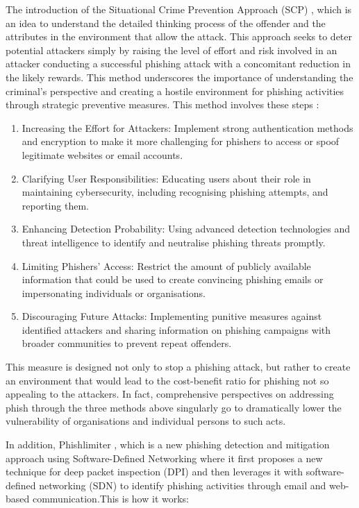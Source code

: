 The introduction of the Situational Crime Prevention Approach (SCP) \cite{Suzuki2021Phishing}, which is an idea to understand the detailed thinking process of the offender and the attributes in the environment that allow the attack. This approach seeks to deter potential attackers simply by raising the level of effort and risk involved in an attacker conducting a successful phishing attack with a concomitant reduction in the likely rewards. This method underscores the importance of understanding the criminal's perspective and creating a hostile environment for phishing activities through strategic preventive measures. This method involves these steps : 

\begin{enumerate}
    \item Increasing the Effort for Attackers: Implement strong authentication methods and encryption to make it more challenging for phishers to access or spoof legitimate websites or email accounts.
    \item Clarifying User Responsibilities: Educating users about their role in maintaining cybersecurity, including recognising phishing attempts, and reporting them.
    \item Enhancing Detection Probability: Using advanced detection technologies and threat intelligence to identify and neutralise phishing threats promptly.
    \item Limiting Phishers' Access: Restrict the amount of publicly available information that could be used to create convincing phishing emails or impersonating individuals or organisations.
    \item Discouraging Future Attacks: Implementing punitive measures against identified attackers and sharing information on phishing campaigns with broader communities to prevent repeat offenders.
\end{enumerate}

This measure is designed not only to stop a phishing attack, but rather to create an environment that would lead to the cost-benefit ratio for phishing not so appealing to the attackers. In fact, comprehensive perspectives on addressing phish through the three methods above singularly go to dramatically lower the vulnerability of organisations and individual persons to such acts.

In addition, Phishlimiter \cite{Chin2018PhishLimiter} , which is a new phishing detection and mitigation approach using Software-Defined Networking where it first proposes a new technique for deep packet inspection (DPI) and then leverages it with software-defined networking (SDN) to identify phishing activities through email and web-based communication.This is how it works:

